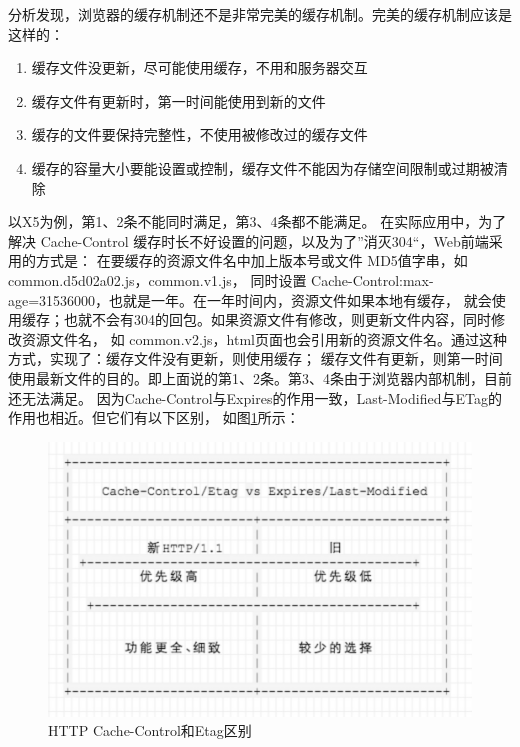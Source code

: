 \documentclass{book}
\begin{document}
分析发现，浏览器的缓存机制还不是非常完美的缓存机制。完美的缓存机制应该是这样的：

\begin{enumerate}
\setcounter{enumi}{0}
\item{缓存文件没更新，尽可能使用缓存，不用和服务器交互}
\item{缓存文件有更新时，第一时间能使用到新的文件}
\item{缓存的文件要保持完整性，不使用被修改过的缓存文件}
\item{缓存的容量大小要能设置或控制，缓存文件不能因为存储空间限制或过期被清除}
\end{enumerate}

以X5为例，第1、2条不能同时满足，第3、4条都不能满足。
在实际应用中，为了解决 Cache-Control 缓存时长不好设置的问题，以及为了”消灭304“，Web前端采用的方式是：
在要缓存的资源文件名中加上版本号或文件 MD5值字串，如 common.d5d02a02.js，common.v1.js，
同时设置 Cache-Control:max-age=31536000，也就是一年。在一年时间内，资源文件如果本地有缓存，
就会使用缓存；也就不会有304的回包。如果资源文件有修改，则更新文件内容，同时修改资源文件名，
如 common.v2.js，html页面也会引用新的资源文件名。通过这种方式，实现了：缓存文件没有更新，则使用缓存；
缓存文件有更新，则第一时间使用最新文件的目的。即上面说的第1、2条。第3、4条由于浏览器内部机制，目前还无法满足。
因为Cache-Control与Expires的作用一致，Last-Modified与ETag的作用也相近。但它们有以下区别，
如图\ref{fig:HttpCacheControlEtag}所示：

\begin{figure}[!b]
	\centering
	\includegraphics[scale=1]{HttpCacheControlEtag.jpg}
	\caption{HTTP Cache-Control和Etag区别}
	\label{fig:HttpCacheControlEtag}
\end{figure}
\end{document}
